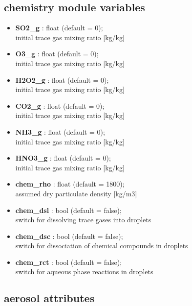 \documentclass[11pt]{article}
\begin{document}
\subsection{chemistry module variables}

\begin{itemize}

  \item \textbf{SO2\_g}    : float (default = 0); \\ initial  trace gas mixing ratio [kg/kg]
  \item \textbf{O3\_g}     : float (default = 0); \\ initial  trace gas mixing ratio [kg/kg]
  \item \textbf{H2O2\_g}   : float (default = 0); \\ initial  trace gas mixing ratio [kg/kg]
  \item \textbf{CO2\_g}    : float (default = 0); \\ initial  trace gas mixing ratio [kg/kg]
  \item \textbf{NH3\_g}    : float (default = 0); \\ initial  trace gas mixing ratio [kg/kg]
  \item \textbf{HNO3\_g}   : float (default = 0); \\ initial  trace gas mixing ratio [kg/kg]
  \item \textbf{chem\_rho} : float (default = 1800);  \\ assumed dry particulate density [kg/m3]
  \item \textbf{chem\_dsl} : bool  (default = false); \\ switch for dissolving trace gases into droplets
  \item \textbf{chem\_dsc} : bool  (default = false); \\ switch for dissociation of chemical compounds in droplets
  \item \textbf{chem\_rct} : bool  (default = false); \\ switch for aqueous phase reactions in droplets

\end{itemize}

\subsection{aerosol attributes}
\end{document}
